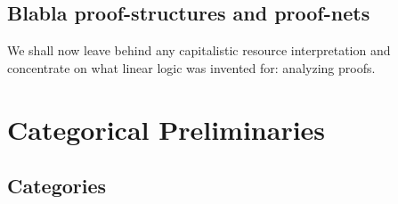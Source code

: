 \documentclass[DIN, pagenumber=false, fontsize=11pt, parskip=half, colorinlistoftodos, svgnames]{scrartcl}
\begin{document}
	\subsection{Blabla proof-structures and proof-nets}
	
	We shall now leave behind any capitalistic resource interpretation and concentrate on what linear logic was invented for: analyzing proofs.
	
	
	
	
	\section{Categorical Preliminaries}
	
	\subsection{Categories}
	\label{sec: catSec}
	
	
\end{document}
